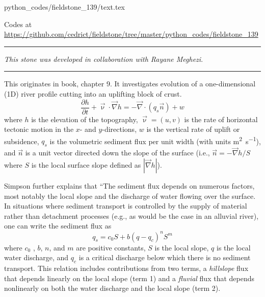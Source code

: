 \begin{flushright} {\tiny {\color{gray} python\_codes/fieldstone\_139/text.tex}} \end{flushright}

%

\begin{center}

Codes at \url{https://github.com/cedrict/fieldstone/tree/master/python_codes/fieldstone_139}
\end{center}

\par\noindent\rule{\textwidth}{0.4pt}

{\sl This stone was developed in collaboration with Rayane Meghezi}. 

\par\noindent\rule{\textwidth}{0.4pt}

This \stone originates in \textcite{simp17} book, chapter 9.
It investigates evolution of a one-dimensional (1D) river profile cutting into an uplifting
block of crust.
\[
\frac{\partial h}{\partial t} + \vec{\upnu}\cdot \vec{\nabla} h = -\vec\nabla \cdot (q_s \vec{n}) + w
\]
where $h$ is the elevation of the topography, $\vec\upnu=(u,v)$ is the rate of horizontal tectonic 
motion in the
$x$- and $y$-directions, $w$ is the vertical rate of uplift or subsidence, $q_s$ is the volumetric
sediment flux per unit width (with units \si{\square\meter\per\second}), and 
$\vec{n}$ is a unit vector directed down the slope of
the surface (i.e., $\vec{n} = -\vec\nabla h/S$ where $S$ is the local surface slope defined 
as $|\vec\nabla h|$).

Simpson further explains that ``The sediment flux
depends on numerous factors, most notably the local slope and the discharge of water flowing over
the surface. In situations where sediment transport is controlled by the supply of material rather
than detachment processes (e.g., as would be the case in an alluvial river), one can write the sediment
flux as
\[
q_s = c_0 S + b(q-q_c)^n S^m
\]
where $c_0$ , $b$, $n$, and $m$ are positive constants, $S$ is the local slope, 
$q$ is the local water discharge, and $q_c$ is
a critical discharge below which there is no sediment transport. This relation includes contributions
from two terms, a {\it hillslope} flux that depends linearly on the local slope (term 1) 
and a {\it fluvial} flux that depends nonlinearly on both the water discharge and the local slope (term 2).

